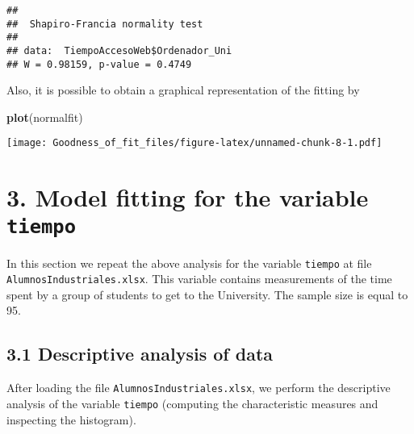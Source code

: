 \documentclass[
]{article}
\newenvironment{Shaded}{\begin{snugshade}}{\end{snugshade}}
\newcommand{\FunctionTok}[1]{\textcolor[rgb]{0.13,0.29,0.53}{\textbf{#1}}}
\newcommand{\NormalTok}[1]{#1}
\newcommand{\SpecialCharTok}[1]{\textcolor[rgb]{0.81,0.36,0.00}{\textbf{#1}}}
\begin{document}
\begin{Shaded}
\end{Shaded}

\begin{verbatim}
## 
##  Shapiro-Francia normality test
## 
## data:  TiempoAccesoWeb$Ordenador_Uni
## W = 0.98159, p-value = 0.4749
\end{verbatim}

\vspace{0.5cm}

Also, it is possible to obtain a graphical representation of the fitting
by

\begin{Shaded}
\begin{Highlighting}[]
\FunctionTok{plot}\NormalTok{(normalfit)}
\end{Highlighting}
\end{Shaded}

\texttt{[image: Goodness\_of\_fit\_files/figure-latex/unnamed-chunk-8-1.pdf]}

\hypertarget{model-fitting-for-the-variable-tiempo}{%
\section{\texorpdfstring{3. Model fitting for the variable
\texttt{tiempo}}{3. Model fitting for the variable tiempo}}\label{model-fitting-for-the-variable-tiempo}}

In this section we repeat the above analysis for the variable
\texttt{tiempo} at file \texttt{AlumnosIndustriales.xlsx}. This variable
contains measurements of the time spent by a group of students to get to
the University. The sample size is equal to 95.

\hypertarget{descriptive-analysis-of-data}{%
\subsection{3.1 Descriptive analysis of
data}\label{descriptive-analysis-of-data}}

After loading the file \texttt{AlumnosIndustriales.xlsx}, we perform the
descriptive analysis of the variable \texttt{tiempo} (computing the
characteristic measures and inspecting the histogram).

\begin{Shaded}
\end{Shaded}
\end{document}
